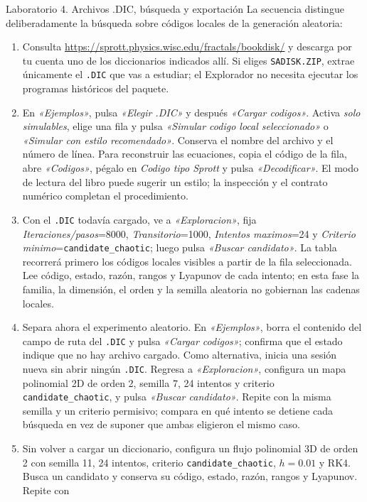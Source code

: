 \documentclass[11pt]{article}
\newcommand{\codigo}[1]{\texttt{#1}}
\newcommand{\boton}[1]{\textsf{\itshape «#1»}}
\newcommand{\control}[1]{\textsf{\itshape #1}}
\begin{document}
\begin{laboratorio}{Laboratorio 4. Archivos .DIC, búsqueda y exportación}
La secuencia distingue deliberadamente la búsqueda sobre códigos locales de la
generación aleatoria:
\begin{enumerate}
  \item Consulta \url{https://sprott.physics.wisc.edu/fractals/bookdisk/} y descarga por
  tu cuenta uno de los diccionarios indicados allí. Si eliges \codigo{SADISK.ZIP},
  extrae únicamente el \codigo{.DIC} que vas a estudiar; el Explorador no necesita
  ejecutar los programas históricos del paquete.
  \item En \boton{Ejemplos}, pulsa \boton{Elegir .DIC} y después
  \boton{Cargar codigos}. Activa \control{solo simulables}, elige una fila y pulsa
  \boton{Simular codigo local seleccionado} o \boton{Simular con estilo recomendado}.
  Conserva el nombre del archivo y el número de línea. Para reconstruir las ecuaciones,
  copia el código de la fila, abre \boton{Codigos}, pégalo en
  \control{Codigo tipo Sprott} y pulsa \boton{Decodificar}. El modo de lectura del libro
  puede sugerir un estilo; la inspección y el contrato numérico completan el procedimiento.
  \item Con el \codigo{.DIC} todavía cargado, ve a \boton{Exploracion}, fija
  \control{Iteraciones/pasos}=8000, \control{Transitorio}=1000,
  \control{Intentos maximos}=24 y
  \control{Criterio minimo}=\codigo{candidate\_chaotic}; luego pulsa
  \boton{Buscar candidato}. La tabla recorrerá primero los códigos locales visibles a
  partir de la fila seleccionada. Lee código, estado, razón, rangos y Lyapunov de cada
  intento; en esta fase la familia, la dimensión, el orden y la semilla aleatoria no
  gobiernan las cadenas locales.
  \item Separa ahora el experimento aleatorio. En \boton{Ejemplos}, borra el contenido
  del campo de ruta del \codigo{.DIC} y pulsa \boton{Cargar codigos}; confirma que el
  estado indique que no hay archivo cargado. Como alternativa, inicia una sesión nueva
  sin abrir ningún \codigo{.DIC}. Regresa a \boton{Exploracion}, configura un mapa
  polinomial 2D de orden 2, semilla 7, 24 intentos y criterio
  \codigo{candidate\_chaotic}, y pulsa \boton{Buscar candidato}. Repite con la misma
  semilla y un criterio permisivo; compara en qué intento se detiene cada búsqueda en
  vez de suponer que ambas eligieron el mismo caso.
  \item Sin volver a cargar un diccionario, configura un flujo polinomial 3D de orden 2
  con semilla 11, 24 intentos, criterio \codigo{candidate\_chaotic}, \(h=0.01\) y RK4.
  Busca un candidato y conserva su código, estado, razón, rangos y Lyapunov. Repite con

\end{enumerate}
\end{laboratorio}
\end{document}
